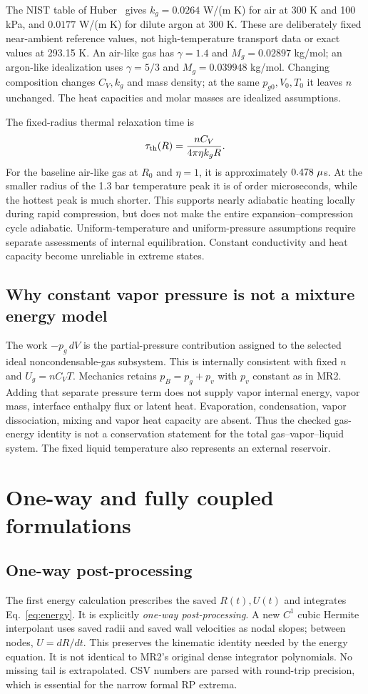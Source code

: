 \documentclass[10pt,a4paper]{article}
\begin{document}
The NIST table of Huber~\cite{huber} gives $k_g=0.0264$ W/(m K) for air at 300 K and 100 kPa, and $0.0177$ W/(m K) for dilute argon at 300 K. These are deliberately fixed near-ambient reference values, not high-temperature transport data or exact values at 293.15 K. An air-like gas has $\gamma=1.4$ and $M_g=0.02897$ kg/mol; an argon-like idealization uses $\gamma=5/3$ and $M_g=0.039948$ kg/mol. Changing composition changes $C_V,k_g$ and mass density; at the same $p_{g0},V_0,T_0$ it leaves $n$ unchanged. The heat capacities and molar masses are idealized assumptions.

The fixed-radius thermal relaxation time is
\begin{equation}
\tau_{\rm th}(R)=\frac{nC_V}{4\pi\eta k_gR}.
\end{equation}
For the baseline air-like gas at $R_0$ and $\eta=1$, it is approximately $\TauInitialUs\ \mu$s. At the smaller radius of the 1.3 bar temperature peak it is of order microseconds, while the hottest peak is much shorter. This supports nearly adiabatic heating locally during rapid compression, but does not make the entire expansion--compression cycle adiabatic. Uniform-temperature and uniform-pressure assumptions require separate assessments of internal equilibration. Constant conductivity and heat capacity become unreliable in extreme states.

\subsection{Why constant vapor pressure is not a mixture energy model}
The work $-p_g\,dV$ is the partial-pressure contribution assigned to the selected ideal noncondensable-gas subsystem. This is internally consistent with fixed $n$ and $U_g=nC_VT$. Mechanics retains $p_B=p_g+p_v$ with $p_v$ constant as in MR2. Adding that separate pressure term does not supply vapor internal energy, vapor mass, interface enthalpy flux or latent heat. Evaporation, condensation, vapor dissociation, mixing and vapor heat capacity are absent. Thus the checked gas-energy identity is not a conservation statement for the total gas--vapor--liquid system. The fixed liquid temperature also represents an external reservoir.

\newpage
\section{One-way and fully coupled formulations}
\subsection{One-way post-processing}
The first energy calculation prescribes the saved $R(t),U(t)$ and integrates Eq.~\eqref{eq:energy}. It is explicitly \emph{one-way post-processing}. A new $C^1$ cubic Hermite interpolant uses saved radii and saved wall velocities as nodal slopes; between nodes, $U=dR/dt$. This preserves the kinematic identity needed by the energy equation. It is not identical to MR2's original dense integrator polynomials. No missing tail is extrapolated. CSV numbers are parsed with round-trip precision, which is essential for the narrow formal RP extrema.
\end{document}
